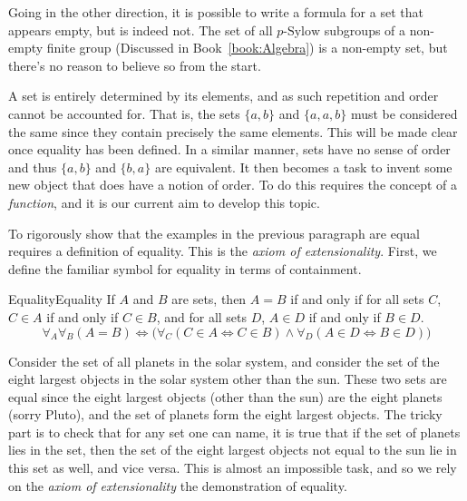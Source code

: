         \begin{example}
            Going in the other direction, it is possible to write a formula for
            a set that appears empty, but is indeed not. The set of all
            $p\textrm{-Sylow}$ subgroups of a non-empty
            finite group (Discussed in Book~\ref{book:Algebra}) is a non-empty
            set, but there's no reason to believe so from the start.
        \end{example}
        A set is entirely determined by its elements, and as such repetition and
        order cannot be accounted for. That is, the sets $\{a,b\}$ and
        $\{a,a,b\}$ must be considered the same since they contain precisely the
        same elements. This will be made clear once equality has been defined.
        In a similar manner, sets have no sense of order and thus $\{a,b\}$ and
        $\{b,a\}$ are equivalent. It then becomes a task to invent some new
        object that does have a notion of order. To do this requires the concept
        of a \textit{function}, and it is our current aim to
        develop this topic.
        \par\hfill\par
        To rigorously show that the examples in the previous paragraph are equal
        requires a definition of equality. This is the
        \textit{axiom of extensionality}. First,
        we define the familiar symbol for equality in terms of
        containment.
        \begin{fnotation}{Equality}{Equality}
            If $A$ and $B$ are sets, then $A=B$ if and only if for all sets
            $C$, $C\in{A}$ if and only if $C\in{B}$, and for all sets $D$,
            $A\in{D}$ if and only if $B\in{D}$.
            \begin{equation*}
                \forall_{A}\forall_{B}(A=B)
                \Longleftrightarrow\Big(
                    \forall_{C}(C\in{A}\Leftrightarrow{C}\in{B})
                    \land\forall_{D}(A\in{D}\Leftrightarrow{B}\in{D})\Big)
            \end{equation*}
        \end{fnotation}
        \begin{example}
            Consider the set of all planets in the solar system, and consider
            the set of the eight largest objects in the solar system other than
            the sun. These two sets are equal since the eight largest objects
            (other than the sun) are the eight planets (sorry Pluto), and the
            set of planets form the eight largest objects. The tricky part is
            to check that for any set one can name, it is true that if the set
            of planets lies in the set, then the set of the eight largest
            objects not equal to the sun lie in this set as well, and vice
            versa. This is almost an impossible task, and so we rely on the
            \textit{axiom of extensionality} the demonstration of equality.
        \end{example} 
